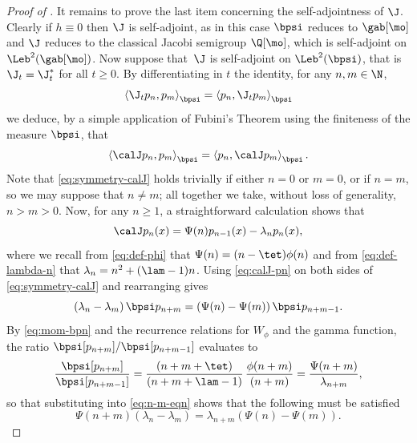 \begin{proof}[Proof of ]
It remains to prove the last item concerning the self-adjointness of $\J$. Clearly if $h \equiv 0$ then $\J$ is self-adjoint, as in this case $\bpsi$ reduces to $\gab[\mo]$ and $\J$ reduces to the classical Jacobi semigroup $\Q[\mo]$, which is self-adjoint on $\Leb^2(\gab[\mo])$. Now suppose that~$\J$ is self-adjoint on $\Leb^2(\bpsi)$, that is $\J_t = \J_t^*$ for all $t \geq 0$. By differentiating in $t$ the identity, for any $n, m \in \N$,
\begin{equation*}
\left\langle \J_t p_n, p_m \right\rangle_{\bpsi} = \left\langle p_n, \J_t p_m \right\rangle_{\bpsi}
\end{equation*}
we deduce, by a simple application of Fubini's Theorem using the finiteness of the measure $\bpsi$, that
\begin{equation}
\label{eq:symmetry-calJ}
\left\langle \calJ p_n, p_m \right\rangle_{\bpsi} = \left\langle p_n, \calJ p_m \right\rangle_{\bpsi}.
\end{equation}
Note that \eqref{eq:symmetry-calJ} holds trivially if either $n=0$ or $m=0$, or if $n=m$, so we may suppose that $n \neq m$; all together we take, without loss of generality, $n > m > 0$. Now, for any $n \geq 1$, a straightforward calculation shows that
\begin{equation}
\label{eq:calJ-pn}
\calJ p_n(x) = \Psi(n)p_{n-1}(x)-\lambda_n p_n(x),
\end{equation}
where we recall from \eqref{eq:def-phi} that $\Psi(n) = (n-\tet)\phi(n)$ and from \eqref{eq:def-lambda-n} that $\lambda_n = n^2+(\lam-1)n$. Using \eqref{eq:calJ-pn} on both sides of \eqref{eq:symmetry-calJ} and rearranging gives
\begin{equation}
\label{eq:n-m-eqn}
\left(\lambda_n-\lambda_m\right) \bpsi p_{n+m} = \left(\Psi(n)-\Psi(m)\right) \bpsi p_{n+m-1}.
\end{equation}
By \eqref{eq:mom-bpn} and the recurrence relations for $W_\phi$ and the gamma function, the ratio $\bpsi [p_{n+m}] / \bpsi [p_{n+m-1}]$ evaluates to
\begin{equation*}
\frac{\bpsi [p_{n+m}]}{\bpsi [p_{n+m-1}]} = \frac{(n+m+\tet)}{(n+m+\lam-1)}\,\frac{\phi(n+m)}{(n+m)} = \frac{\Psi(n+m)}{\lambda_{n+m}},
\end{equation*}
so that substituting into \eqref{eq:n-m-eqn} shows that the following must be satisfied
\begin{equation}
\label{eq:Psi-n-m}
\Psi(n+m)\left(\lambda_n-\lambda_m\right) = \lambda_{n+m}\left(\Psi(n)-\Psi(m)\right).
\end{equation}

\end{proof}
